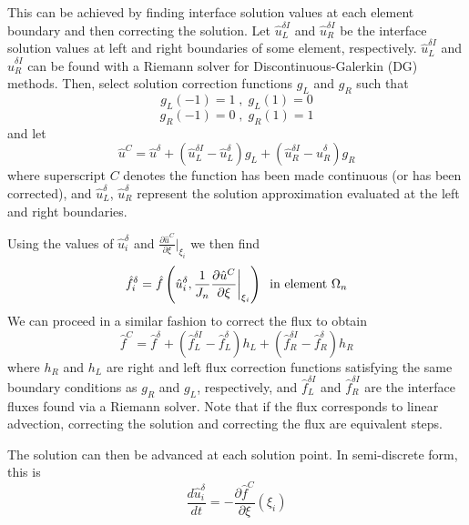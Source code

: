 This can be achieved by finding interface solution values at each element boundary and then correcting the 
solution. Let $\hat{u}_L^{\delta I}$ and $\hat{u}_R^{\delta I}$ be the interface solution values at left and right 
boundaries of some element, respectively. $\hat{u}_L^{\delta I}$ and $\hat{u}_R^{\delta I}$ can be found with a Riemann solver for Discontinuous-Galerkin (DG) methods\cite{hesthaven2007}. Then, select solution correction functions $g_L$ and 
$g_R$ such 
that
\begin{equation}\label{eq:condition}
g_L(-1) = 1 \;,\; g_L(1) = 0
\end{equation}
\begin{equation}
g_R(-1) = 0 \;,\; g_R(1) = 1
\end{equation}
and let
\begin{equation}
\hat{u}^C = \hat{u}^\delta + (\hat{u}^{\delta I}_L - \hat{u}^\delta_L) g_L + (\hat{u}^{\delta I}_R 
- \hat{u}^\delta_R) g_R
\end{equation}
where superscript $C$ denotes the function has been made continuous (or has been corrected), and $\hat{u}^\delta_L$, $\hat{u}^\delta_R$ 
represent the solution approximation evaluated at the left and right boundaries.

Using the values of $\hat{u}^\delta_i$ and $\frac{\partial \hat{u}^C}{\partial \xi}|_{\xi_i}$ we then find 
$$\hat{f}_i^\delta = \hat{f}\left(\hat{u}^\delta_i,\frac{1}{J_n}\frac{\partial \hat{u}^C}{\partial \xi}\bigg|_{\xi_i}\right) \;\; \text{in element } \Omega_n$$
We can proceed in a similar fashion to correct the flux to obtain
\begin{equation}
\hat{f}^C = \hat{f}^\delta + (\hat{f}^{\delta I}_L - \hat{f}^\delta_L) h_L + (\hat{f}^{\delta I}_R 
- \hat{f}^\delta_R) h_R
\end{equation}
where $h_R$ and $h_L$ are right and left flux correction functions satisfying the same boundary 
conditions as $g_R$ and $g_L$, respectively, and $\hat{f}_L^{\delta I}$ and $\hat{f}_R^{\delta I}$ are the interface fluxes found via a Riemann solver. Note that if the flux corresponds to linear advection, correcting the solution and correcting the flux are equivalent steps.

The solution can then be advanced at each solution point. In semi-discrete form, this is
\begin{equation}\label{eq:semidiscrete}
\frac{d \hat{u}_i^\delta}{d t} = - \frac{\partial \hat{f}^C}{\partial \xi}(\xi_i)
\end{equation}

